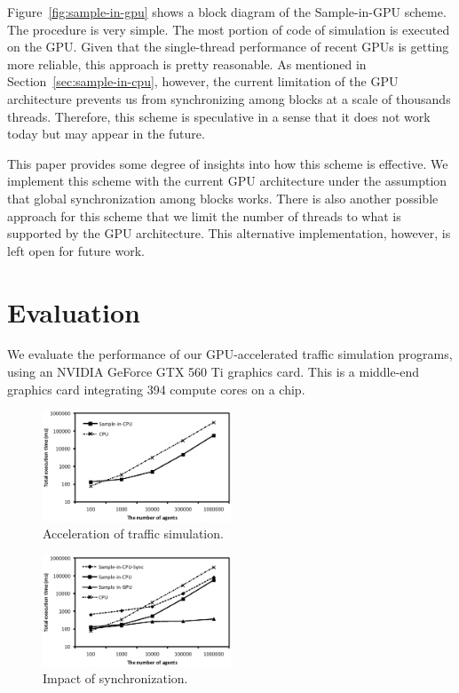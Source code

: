 \documentclass[times, 10pt, twocolumn]{article}
\begin{document}
Figure~\ref{fig:sample-in-gpu} shows a block diagram of the
Sample-in-GPU scheme.
The procedure is very simple.
The most portion of code of simulation is executed on the GPU.
Given that the single-thread performance of recent GPUs is getting more
reliable, this approach is pretty reasonable.
As mentioned in Section~\ref{sec:sample-in-cpu}, however, the current
limitation of the GPU architecture prevents us from synchronizing among
blocks at a scale of thousands threads.
Therefore, this scheme is speculative in a sense that it does not work today
but may appear in the future.

This paper provides some degree of insights into how this scheme is
effective.
We implement this scheme with the current GPU architecture under the
assumption that global synchronization among blocks works.
There is also another possible approach for this scheme that we limit
the number of threads to what is supported by the GPU architecture.
This alternative implementation, however, is left open for future work.

\section{Evaluation}
\label{sec:evaluation}

We evaluate the performance of our GPU-accelerated traffic simulation
programs, using an NVIDIA GeForce GTX 560 Ti graphics card.
This is a middle-end graphics card integrating 394 compute cores on a
chip.

\begin{figure}[t]
\centering
\includegraphics[width=0.5\textwidth]{eps/eval_accel.eps}
\caption{Acceleration of traffic simulation.}
\label{fig:eval_accel}
\end{figure}

\begin{figure}[t]
\centering
\includegraphics[width=0.5\textwidth]{eps/eval_nosync.eps}
\caption{Impact of synchronization.}
\label{fig:eval_nosync}
\end{figure}
\end{document}
